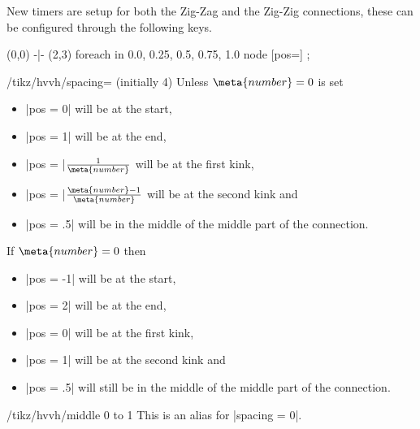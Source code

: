 New timers are setup for both the Zig-Zag and the Zig-Zig connections,
these can be configured through the following keys.
\begin{codeexample}[width=8cm,preamble=\usetikzlibrary{paths.ortho}]
\tikz \draw (0,0) -|- (2,3) 
  foreach \p in {0.0, 0.25, 0.5, 0.75, 1.0}{
    node [pos=\p] {\p}};
\end{codeexample}
\begin{key}{/tikz/hvvh/spacing= (initially 4)}
  Unless $\meta{number} = 0$ is set
  \begin{itemize}
  \item |pos = 0| will be at the start,
  \item |pos = 1| will be at the end,
  \item |pos = |$\frac{1}{\meta{number}}$ will be at the first kink,
  \item |pos = |$\frac{\meta{number}-1}{\meta{number}}$ will be at the second kink and
  \item |pos = .5| will be in the middle of the middle part of the connection.
  \end{itemize}
  
  If $\meta{number} = 0$ then
  \begin{itemize}
  \item |pos = -1| will be at the start,
  \item |pos = 2| will be at the end,
  \item |pos = 0| will be at the first kink,
  \item |pos = 1| will be at the second kink and
  \item |pos = .5| will still be in the middle of the middle part of the connection.
  \end{itemize}
\end{key}
\begin{key}{/tikz/hvvh/middle 0 to 1}
  This is an alias for |spacing = 0|.
\end{key}

